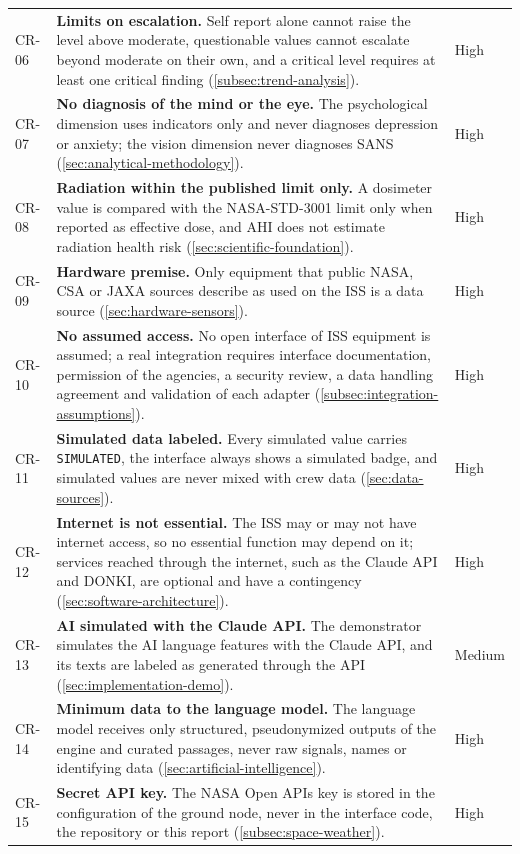 {\begin{longtable}{p{1.5cm}p{10.8cm}p{1.5cm}}
CR-06 & \textbf{Limits on escalation.} Self report alone cannot raise the level above moderate, questionable values cannot escalate beyond moderate on their own, and a critical level requires at least one critical finding (\ref{subsec:trend-analysis}). & High \\
CR-07 & \textbf{No diagnosis of the mind or the eye.} The psychological dimension uses indicators only and never diagnoses depression or anxiety; the vision dimension never diagnoses SANS (\ref{sec:analytical-methodology}). & High \\
CR-08 & \textbf{Radiation within the published limit only.} A dosimeter value is compared with the NASA-STD-3001 limit only when reported as effective dose, and AHI does not estimate radiation health risk (\ref{sec:scientific-foundation}). & High \\
CR-09 & \textbf{Hardware premise.} Only equipment that public NASA, CSA or JAXA sources describe as used on the ISS is a data source (\ref{sec:hardware-sensors}). & High \\
CR-10 & \textbf{No assumed access.} No open interface of ISS equipment is assumed; a real integration requires interface documentation, permission of the agencies, a security review, a data handling agreement and validation of each adapter (\ref{subsec:integration-assumptions}). & High \\
CR-11 & \textbf{Simulated data labeled.} Every simulated value carries \texttt{SIMULATED}, the interface always shows a simulated badge, and simulated values are never mixed with crew data (\ref{sec:data-sources}). & High \\
CR-12 & \textbf{Internet is not essential.} The ISS may or may not have internet access, so no essential function may depend on it; services reached through the internet, such as the Claude API and DONKI, are optional and have a contingency (\ref{sec:software-architecture}). & High \\
CR-13 & \textbf{AI simulated with the Claude API.} The demonstrator simulates the AI language features with the Claude API, and its texts are labeled as generated through the API (\ref{sec:implementation-demo}). & Medium \\
CR-14 & \textbf{Minimum data to the language model.} The language model receives only structured, pseudonymized outputs of the engine and curated passages, never raw signals, names or identifying data (\ref{sec:artificial-intelligence}). & High \\
CR-15 & \textbf{Secret API key.} The NASA Open APIs key is stored in the configuration of the ground node, never in the interface code, the repository or this report (\ref{subsec:space-weather}). & High \\

\end{longtable}}
